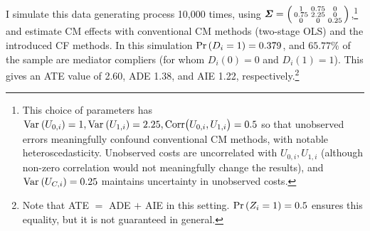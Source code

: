 I simulate this data generating process 10,000 times, using $\boldsymbol{\mathit{\Sigma}} =
\left(\begin{smallmatrix} 1 & 0.75 & 0 \\ 0.75 & 2.25 & 0 \\ 0 & 0 & 0.25 \end{smallmatrix}\right)$,\footnote{
    This choice of parameters has $\text{Var}_{} \left( U_{0,i} \right) = 1, \text{Var}_{} \left( U_{1,i} \right) = 2.25, \text{Corr}\big(U_{0,i}, U_{1,i}\big) = 0.5$ so that unobserved errors meaningfully confound conventional CM methods, with notable heteroscedasticity.
    Unobserved costs are uncorrelated with $U_{0,i}, U_{1,i}$ (although non-zero correlation would not meaningfully change the results), and $\text{Var}_{} \left( U_{C,i} \right) = 0.25$ maintains uncertainty in unobserved costs.
}
and estimate CM effects with conventional CM methods (two-stage OLS) and the introduced CF methods.
In this simulation $\Pr\left( D_i = 1 \right) = 0.379$, and $65.77\%$ of the sample are mediator compliers (for whom $D_i(0)=0$ and $D_i(1)=1$).
This gives an ATE value of 2.60, ADE 1.38, and AIE 1.22, respectively.\footnote{
    Note that ATE $=$ ADE $+$ AIE in this setting.
    $\Pr\left( Z_i=1 \right) = 0.5$ ensures this equality, but it is not guaranteed in general.
}

